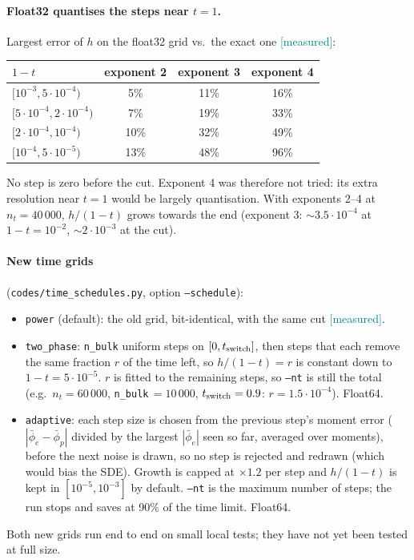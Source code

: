 \documentclass[11pt,a4paper]{article}
\newcommand{\code}[1]{\texttt{#1}}
\newcommand{\meas}{\textcolor{teal}{\textsf{[measured]}}}
\begin{document}
\paragraph{Float32 quantises the steps near $t=1$.} Largest error of $h$ on the float32 grid vs.\ the
exact one \meas:
\begin{center}\small
\begin{tabular}{@{}lccc@{}}
\toprule
$1-t$ & exponent 2 & exponent 3 & exponent 4\\
\midrule
$[10^{-3},5\cdot10^{-4})$ & 5\% & 11\% & 16\%\\
$[5\cdot10^{-4},2\cdot10^{-4})$ & 7\% & 19\% & 33\%\\
$[2\cdot10^{-4},10^{-4})$ & 10\% & 32\% & 49\%\\
$[10^{-4},5\cdot10^{-5})$ & 13\% & 48\% & 96\%\\
\bottomrule
\end{tabular}
\end{center}
No step is zero before the cut. Exponent 4 was therefore not tried: its extra resolution near $t=1$
would be largely quantisation. With exponents 2--4 at $n_t=40\,000$, $h/(1-t)$ grows towards the end
(exponent 3: $\sim3.5\cdot10^{-4}$ at $1-t=10^{-2}$, $\sim2\cdot10^{-3}$ at the cut).

\paragraph{New time grids} (\code{codes/time\_schedules.py}, option \code{--schedule}):
\begin{itemize}
  \item \code{power} (default): the old grid, bit-identical, with the same cut \meas.
  \item \code{two\_phase}: \code{n\_bulk} uniform steps on $[0,t_{\rm switch}]$, then steps that each
        remove the same fraction $r$ of the time left, so $h/(1-t)=r$ is constant down to
        $1-t=5\cdot10^{-5}$. $r$ is fitted to the remaining steps, so \code{--nt} is still the total
        (e.g.\ $n_t=60\,000$, \code{n\_bulk}$\,=10\,000$, $t_{\rm switch}=0.9$: $r=1.5\cdot10^{-4}$). Float64.
  \item \code{adaptive}: each step size is chosen from the previous step's moment error
        ($|\bar\phi_e-\bar\phi_p|$ divided by the largest $|\bar\phi_e|$ seen so far, averaged over moments),
        before the next noise is drawn, so no step is rejected and redrawn (which would bias the SDE).
        Growth is capped at $\times1.2$ per step and $h/(1-t)$ is kept in $[10^{-5},10^{-3}]$ by default.
        \code{--nt} is the maximum number of steps; the run stops and saves at 90\% of the time limit. Float64.
\end{itemize}
Both new grids run end to end on small local tests; they have not yet been tested at full size.
\end{document}
